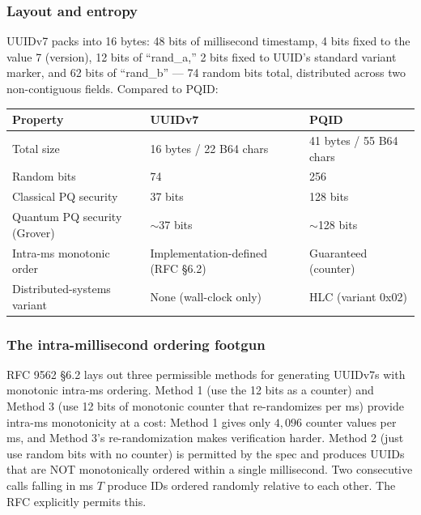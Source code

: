 \subsubsection{Layout and entropy}

UUIDv7 packs into 16 bytes: 48 bits of millisecond timestamp, 4 bits fixed to the value 7 (version), 12 bits of ``rand\_a,'' 2 bits fixed to UUID's standard variant marker, and 62 bits of ``rand\_b'' --- 74 random bits total, distributed across two non-contiguous fields. Compared to PQID:

\begin{center}
\renewcommand{\arraystretch}{1.15}
\begin{tabular}{lll}
\toprule
\textbf{Property} & \textbf{UUIDv7} & \textbf{PQID} \\
\midrule
Total size                  & 16 bytes / 22 B64 chars       & 41 bytes / 55 B64 chars \\
Random bits                 & 74                            & 256 \\
Classical PQ security       & 37 bits                       & 128 bits \\
Quantum PQ security (Grover)& $\sim$37 bits                 & $\sim$128 bits \\
Intra-ms monotonic order    & Implementation-defined (RFC §6.2) & Guaranteed (counter) \\
Distributed-systems variant & None (wall-clock only)        & HLC (variant 0x02) \\
\bottomrule
\end{tabular}
\end{center}

\subsubsection{The intra-millisecond ordering footgun}

RFC 9562 §6.2 lays out three permissible methods for generating UUIDv7s with monotonic intra-ms ordering. Method 1 (use the 12  bits as a counter) and Method 3 (use 12 bits of monotonic counter that re-randomizes per ms) provide intra-ms monotonicity at a cost: Method 1 gives only $4{,}096$ counter values per ms, and Method 3's re-randomization makes verification harder. Method 2 (just use random bits with no counter) is permitted by the spec and produces UUIDs that are NOT monotonically ordered within a single millisecond. Two consecutive calls falling in ms $T$ produce IDs ordered randomly relative to each other. The RFC explicitly permits this.


